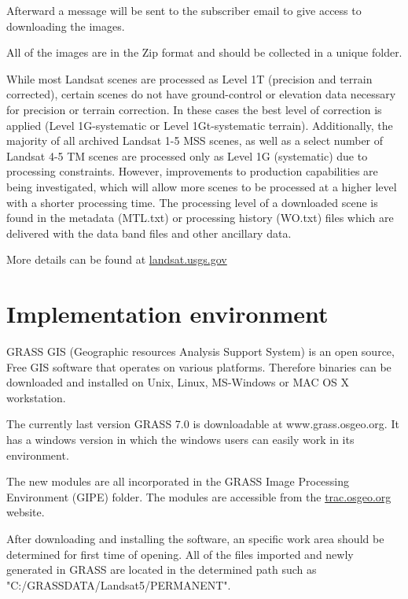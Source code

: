 Afterward a message will be sent to the subscriber email to give access to downloading the images.\newline

All of the images are in the Zip format and should be collected in a unique folder.\newline

While most Landsat scenes are processed as Level 1T (precision and terrain corrected), certain scenes do not have ground-control or elevation data necessary for precision or terrain correction. In these cases the best level of correction is applied (Level 1G-systematic or Level 1Gt-systematic terrain). Additionally, the majority of all archived Landsat 1-5 MSS scenes, as well as a select number of Landsat 4-5 TM scenes are processed only as Level 1G (systematic) due to processing constraints. However, improvements to production capabilities are being investigated, which will allow more scenes to be processed at a higher level with a shorter processing time. The processing level of a downloaded scene is found in the metadata (MTL.txt) or processing history (WO.txt) files which are delivered with the data band files and other ancillary data.\newline

More details can be found at \href{http://landsat.usgs.gov/products\_productinformation.php}{landsat.usgs.gov} \newline


\section{Implementation environment}
GRASS GIS (Geographic resources Analysis Support System) is an open source, Free GIS software that operates on various platforms. Therefore binaries can be downloaded and installed on Unix, Linux, MS-Windows or MAC OS X workstation.\newline

The currently last version GRASS 7.0 is downloadable at www.grass.osgeo.org. It has a windows version in which the windows users can easily work in its environment.\newline

The new modules are all incorporated in the GRASS Image Processing Environment (GIPE) folder. The modules are accessible from the \href{http://trac.osgeo.org/grass/browser/grass-addons/gipe}{trac.osgeo.org} website.\newline

After downloading and installing the software, an specific work area should be determined for first time of opening. All of the files imported and newly generated in GRASS are located in the determined path such as "C:/GRASSDATA/Landsat5/PERMANENT". \newline

